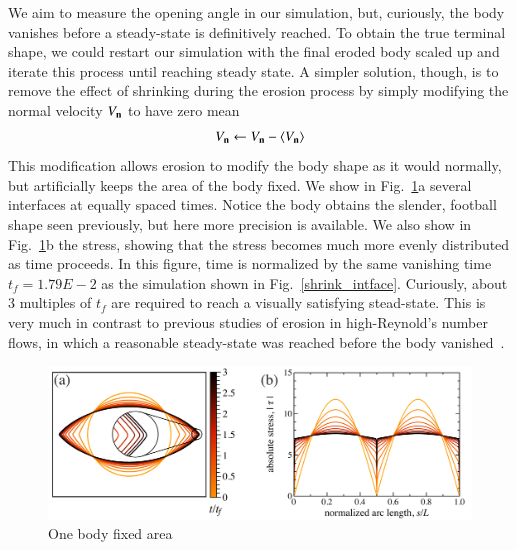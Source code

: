 \documentclass[preprint, 10pt]{elsarticle}
\begin{document}
We aim to measure the opening angle in our simulation, but, curiously,
the body vanishes before a steady-state is definitively reached. To
obtain the true terminal shape, we could restart our simulation with the
final eroded body scaled up and iterate this process until reaching
steady state. A simpler solution, though, is to remove the effect of
shrinking during the erosion process by simply modifying the normal
velocity $V_{\mathbf{n}}$ to have zero mean
\begin{align*}
  V_{\mathbf{n}} \leftarrow V_{\mathbf{n}} - \left< V_{\mathbf{n}} \right>
\end{align*}
This modification allows erosion to modify the body shape as it would
normally, but artificially keeps the area of the body fixed. We show in
Fig.~\ref{fixed_intface}a several interfaces at equally spaced times.
Notice the body obtains the slender, football shape seen previously, but
here more precision is available. We also show in
Fig.~\ref{fixed_intface}b the stress, showing that the stress becomes
much more evenly distributed as time proceeds. In this figure, time is
normalized by the same vanishing time $t_f = 1.79E-2$ as the simulation
shown in Fig.~\ref{shrink_intface}. Curiously, about 3 multiples of
$t_f$ are required to reach a visually satisfying stead-state. This is
very much in contrast to previous studies of erosion in high-Reynold's
number flows, in which a reasonable steady-state was reached before the
body vanished~\cite{moo-ris-chi-zha-she2013}.

\begin{figure}%
\begin{center}
\includegraphics[width = 0.8 \textwidth]{./figs/fixed_intface.pdf}
\caption{One body fixed area}
\label{fixed_intface}
\end{center}
\end{figure}
\end{document}
